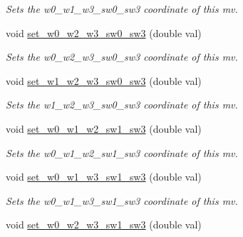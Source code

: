 \begin{DoxyCompactItemize}
\begin{DoxyCompactList}\small\item\em Sets the w0\-\_\-w1\-\_\-w3\-\_\-sw0\-\_\-sw3 coordinate of this mv. \end{DoxyCompactList}\item 
\hypertarget{classe3ga_1_1mv_a87294bf97ea56ead885f56eecd8554b4}{void \hyperlink{classe3ga_1_1mv_a87294bf97ea56ead885f56eecd8554b4}{set\-\_\-w0\-\_\-w2\-\_\-w3\-\_\-sw0\-\_\-sw3} (double val)}\label{classe3ga_1_1mv_a87294bf97ea56ead885f56eecd8554b4}

\begin{DoxyCompactList}\small\item\em Sets the w0\-\_\-w2\-\_\-w3\-\_\-sw0\-\_\-sw3 coordinate of this mv. \end{DoxyCompactList}\item 
\hypertarget{classe3ga_1_1mv_a44d0299f06f2cc507542183ab6cbb495}{void \hyperlink{classe3ga_1_1mv_a44d0299f06f2cc507542183ab6cbb495}{set\-\_\-w1\-\_\-w2\-\_\-w3\-\_\-sw0\-\_\-sw3} (double val)}\label{classe3ga_1_1mv_a44d0299f06f2cc507542183ab6cbb495}

\begin{DoxyCompactList}\small\item\em Sets the w1\-\_\-w2\-\_\-w3\-\_\-sw0\-\_\-sw3 coordinate of this mv. \end{DoxyCompactList}\item 
\hypertarget{classe3ga_1_1mv_aaf94eedd5ee4e6362f5ac0091922b897}{void \hyperlink{classe3ga_1_1mv_aaf94eedd5ee4e6362f5ac0091922b897}{set\-\_\-w0\-\_\-w1\-\_\-w2\-\_\-sw1\-\_\-sw3} (double val)}\label{classe3ga_1_1mv_aaf94eedd5ee4e6362f5ac0091922b897}

\begin{DoxyCompactList}\small\item\em Sets the w0\-\_\-w1\-\_\-w2\-\_\-sw1\-\_\-sw3 coordinate of this mv. \end{DoxyCompactList}\item 
\hypertarget{classe3ga_1_1mv_a8a55b8475989acbb1ec3fcc6c3466340}{void \hyperlink{classe3ga_1_1mv_a8a55b8475989acbb1ec3fcc6c3466340}{set\-\_\-w0\-\_\-w1\-\_\-w3\-\_\-sw1\-\_\-sw3} (double val)}\label{classe3ga_1_1mv_a8a55b8475989acbb1ec3fcc6c3466340}

\begin{DoxyCompactList}\small\item\em Sets the w0\-\_\-w1\-\_\-w3\-\_\-sw1\-\_\-sw3 coordinate of this mv. \end{DoxyCompactList}\item 
\hypertarget{classe3ga_1_1mv_abfd52d9764d828aa64b2ef6f33056ed0}{void \hyperlink{classe3ga_1_1mv_abfd52d9764d828aa64b2ef6f33056ed0}{set\-\_\-w0\-\_\-w2\-\_\-w3\-\_\-sw1\-\_\-sw3} (double val)}\label{classe3ga_1_1mv_abfd52d9764d828aa64b2ef6f33056ed0}


\end{DoxyCompactItemize}
